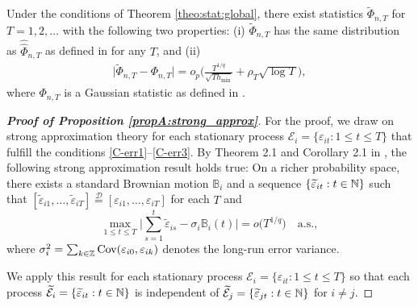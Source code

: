 \documentclass[a4paper,12pt]{article}
\makeatletter
\renewcommand{\eqref}[1]{\tagform@{\ref{#1}}}
\newcommand{\doublehattwo}[1]{\widehat{\widehat{#1}}}
\makeatother
\begin{document}
\begin{propA}\label{propA:strong_approx}
Under the conditions of Theorem \ref{theo:stat:global}, there exist statistics $\widetilde{\Phi}_{n,T}$ for $T = 1,2,\ldots$ with the following two properties: (i) $\widetilde{\Phi}_{n, T}$ has the same distribution as $\doublehattwo{\Phi}_{n, T}$ as defined in \eqref{eqA:Phi_doublehat} for any $T$, and (ii)
\begin{align}\label{eq-strong-approx-equality}
\big| \widetilde{\Phi}_{n, T} - \Phi_{n,T} \big| = o_p \Big( \frac{T^{1/q}}{\sqrt{T h_{\min}}} + \rho_T\sqrt{\log T} \Big),
\end{align}
where $\Phi_{n,T}$ is a Gaussian statistic as defined in \eqref{eq:Phi}. 
\end{propA}
\begin{proof}[\textnormal{\textbf{Proof of Proposition \ref{propA:strong_approx}}}] 
For the proof, we draw on strong approximation theory for each stationary process $\mathcal{E}_i = \{\varepsilon_{it}: 1 \leq t \leq T\}$ that fulfill the conditions \ref{C-err1}--\ref{C-err3}. By Theorem 2.1 and Corollary 2.1 in \cite{BerkesLiuWu2014}, the following strong approximation result holds true: On a richer probability space, there exists a standard Brownian motion $\mathbb{B}_i$ and a sequence $\{ \widetilde{\varepsilon}_{it}: t \in \mathbb{N} \}$ such that $[\widetilde{\varepsilon}_{i1},\ldots,\widetilde{\varepsilon}_{iT}] \stackrel{\mathcal{D}}{=} [\varepsilon_{i1},\ldots,\varepsilon_{iT}]$ for each $T$ and 
\begin{equation}\label{eq-strongapprox-dep}
\max_{1 \le t \le T} \Big| \sum\limits_{s=1}^t \widetilde{\varepsilon}_{is} - \sigma_i \mathbb{B}_i(t) \Big| = o\big( T^{1/q} \big) \quad \text{a.s.},  
\end{equation}
where $\sigma^2_i = \sum_{k \in \mathbb{Z}} \textnormal{Cov}(\varepsilon_{i0}, \varepsilon_{ik})$ denotes the long-run error variance.

We apply this result for each stationary process $\mathcal{E}_i = \{\varepsilon_{it}: 1 \leq t \leq T\}$ so that each process $\widetilde{\mathcal{E}}_i = \{\widetilde{\varepsilon}_{it}: t\in \mathbb{N}\}$ is independent of $\widetilde{\mathcal{E}}_j= \{\widetilde{\varepsilon}_{jt}: t\in \mathbb{N}\}$ for $i \neq j$.


\end{proof}
\end{document}
